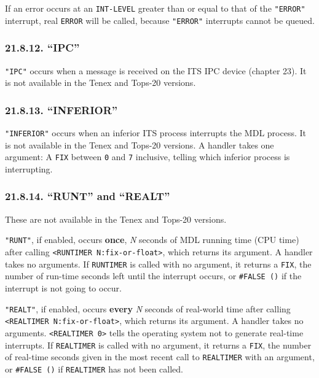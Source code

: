 \documentclass[a4paper,]{article}
\begin{document}
If an error occurs at an \texttt{INT-LEVEL} greater than or equal to that of the \texttt{"ERROR"} interrupt, real
\texttt{ERROR} will be called, because \texttt{"ERROR"} interrupts cannot be queued.

\subsubsection{\texorpdfstring{21.8.12. ``IPC''}{21.8.12. IPC}}\label{ipc}

\texttt{"IPC"}  occurs when a message is received on the ITS IPC device
(chapter 23). It is not available in the Tenex and Tops-20 versions.

\subsubsection{\texorpdfstring{21.8.13. ``INFERIOR''}{21.8.13. INFERIOR}}\label{inferior}

\texttt{"INFERIOR"}  occurs when an inferior ITS process interrupts
the MDL process. It is not available in the Tenex and Tops-20 versions. A
handler takes one argument: A \texttt{FIX} between \texttt{0} and \texttt{7} inclusive, telling which inferior process is
interrupting.

\subsubsection{\texorpdfstring{21.8.14. ``RUNT'' and ``REALT''}{21.8.14. RUNT and REALT}}\label{runt-and-realt}

These are not available in the Tenex and Tops-20 versions.

\texttt{"RUNT"},  if enabled, occurs \textbf{once}, \emph{N} seconds of MDL running time
(CPU time) after calling \texttt{\textless{}RUNTIMER\ N:fix-or-float\textgreater{}}, which
returns its argument. A handler takes no arguments. If \texttt{RUNTIMER} is called with no argument, it returns a
\texttt{FIX}, the number of run-time seconds left until the interrupt occurs, or \texttt{\#FALSE\ ()} if the interrupt is
not going to occur.

\texttt{"REALT"},  if enabled, occurs \textbf{every} \emph{N} seconds of real-world time
after calling \texttt{\textless{}REALTIMER\ N:fix-or-float\textgreater{}}, which returns
its argument. A handler takes no arguments. \texttt{\textless{}REALTIMER\ 0\textgreater{}} tells the operating system not
to generate real-time interrupts. If \texttt{REALTIMER} is called with no argument, it returns a \texttt{FIX}, the number
of real-time seconds given in the most recent call to \texttt{REALTIMER} with an argument, or \texttt{\#FALSE\ ()} if
\texttt{REALTIMER} has not been called.
\end{document}
